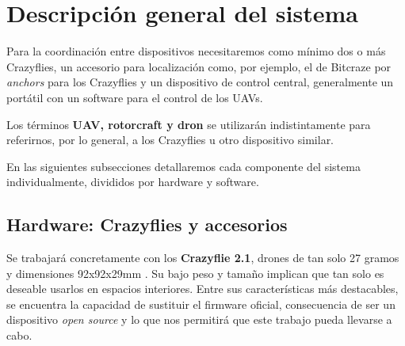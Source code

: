 
\section{Descripción general del sistema}

Para la coordinación entre dispositivos necesitaremos como mínimo dos o más Crazyflies, 
un accesorio para localización como, por ejemplo, el de Bitcraze por \textit{anchors} para los Crazyflies 
y un dispositivo de control central, generalmente un portátil con un software para el control de los UAVs.

Los términos \textbf{UAV, rotorcraft y dron} se utilizarán indistintamente para referirnos, por lo general, 
a los Crazyflies u otro dispositivo similar.

En las siguientes subsecciones detallaremos cada componente del sistema individualmente, divididos por hardware y software.


\subsection{Hardware: Crazyflies y accesorios}

Se trabajará concretamente con los \textbf{Crazyflie 2.1}, drones de tan solo 27 gramos y dimensiones 92x92x29mm \cite{crazyflie_product_page}.
Su bajo peso y tamaño implican que tan solo es deseable usarlos en espacios interiores.
Entre sus características más destacables, se encuentra la capacidad de sustituir el firmware oficial, consecuencia de ser un dispositivo 
\textit{open source} y lo que nos permitirá que este trabajo pueda llevarse a cabo.

